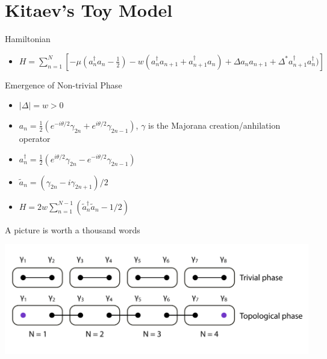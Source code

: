 \documentclass[presentation]{beamer}
\begin{document}
\section{Kitaev's Toy Model}
\label{sec:org494bbcc}
\begin{frame}[label={sec:orgb494ae1}]{Hamiltonian \cite{kitaevUnpairedMajoranaFermions2001}}
\begin{itemize}
\item \(H = \sum_{n=1}^{N} [- \mu (a^{\dagger}_{n}a_{n}- \frac{1}{2}) - w
  (a^{\dagger}_{n}a_{n+1} + a^{\dagger}_{n+1}a_{n}) + \Delta a_{n}a_{n+1} +
  \Delta^{*}a^{\dagger}_{n+1}a^{\dagger}_{n})]\)
\end{itemize}
\end{frame}

\begin{frame}[label={sec:org5f9005a}]{Emergence of Non-trivial Phase \cite{huangIntroductionMajoranaZero2021}}
\begin{itemize}
\item \(|\Delta| = w > 0\)
\item \(a_{n} = \frac{1}{2}(e^{-i \theta /2}\gamma_{2n} +
  e^{i\theta/2}\gamma_{2n-1})\), \(\gamma\) is the Majorana creation/anhilation operator
\item \(a^{\dagger}_{n} = \frac{1}{2}(e^{i\theta/2}\gamma_{2n} -
  e^{-i\theta/2}\gamma_{2n-1})\)
\item \(\tilde{a}_{n} = (\gamma_{2n}-i\gamma_{2n+1})/2\)
\item \(H = 2w \sum_{n=1}^{N-1}(\tilde{a}^{\dagger}_{n}\tilde{a}_{n} -1/2)\)
\end{itemize}
\end{frame}

\begin{frame}[label={sec:org4126ad6}]{A picture is worth a thousand words}
\begin{center}
\includegraphics[width=.9\linewidth]{./two-phases.png}
\end{center}
\end{frame}

\end{document}
